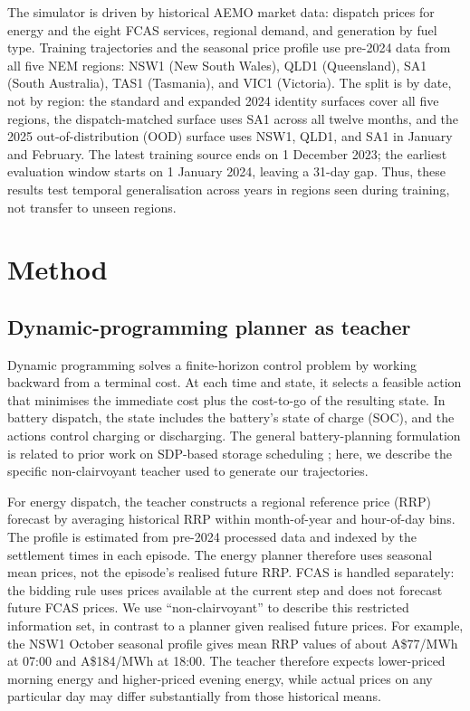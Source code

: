 \documentclass{article}
\begin{document}
The simulator is driven by historical AEMO market data: dispatch prices for
energy and the eight FCAS services, regional demand, and generation by fuel
type. Training trajectories and the seasonal price profile use pre-2024 data
from all five NEM regions: NSW1 (New South Wales), QLD1 (Queensland), SA1
(South Australia), TAS1 (Tasmania), and VIC1 (Victoria). The split is by date,
not by region: the standard and expanded 2024 identity surfaces cover all five
regions, the dispatch-matched surface uses SA1 across all twelve months, and
the 2025 out-of-distribution (OOD) surface uses NSW1, QLD1, and SA1 in January
and February. The latest training source ends on 1 December 2023; the earliest
evaluation window starts on 1 January 2024, leaving a 31-day gap. Thus, these
results test temporal generalisation across years in regions seen during
training, not transfer to unseen regions.

\section{Method}
\label{sec:method}

\subsection{Dynamic-programming planner as teacher}

Dynamic programming solves a finite-horizon control problem by working
backward from a terminal cost. At each time and state, it selects a feasible
action that minimises the immediate cost plus the cost-to-go of the resulting
state. In battery dispatch, the state includes the battery's state of charge
(SOC), and the actions control charging or discharging. The general
battery-planning formulation is related to prior work on SDP-based storage
scheduling \citep{abdulla2016optimal}; here, we describe the specific
non-clairvoyant teacher used to generate our trajectories.

For energy dispatch, the teacher constructs a regional reference price (RRP)
forecast by averaging historical RRP within month-of-year and hour-of-day
bins. The profile is estimated from pre-2024 processed data and indexed by
the settlement times in each episode. The energy planner therefore uses
seasonal mean prices, not the episode's realised future RRP. FCAS is handled
separately: the bidding rule uses prices available at the current step and
does not forecast future FCAS prices. We use ``non-clairvoyant'' to describe
this restricted information set, in contrast to a planner given realised
future prices. For example, the NSW1 October seasonal profile gives mean RRP
values of about A\$77/MWh at 07:00 and A\$184/MWh at 18:00. The teacher
therefore expects lower-priced morning energy and higher-priced evening energy,
while actual prices on any particular day may differ substantially from those
historical means.
\end{document}
